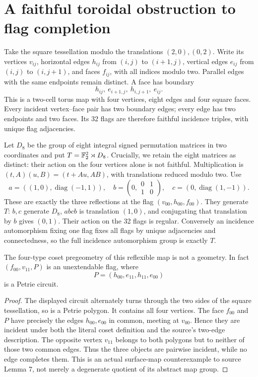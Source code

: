 \documentclass[11pt,a4paper]{article}
\begin{document}
\section{A faithful toroidal obstruction to flag completion}

Take the square tessellation modulo the translations $(2,0),(0,2)$.
Write its vertices $v_{ij}$, horizontal edges $h_{ij}$ from $(i,j)$
to $(i+1,j)$, vertical edges $e_{ij}$ from $(i,j)$ to $(i,j+1)$,
and faces $f_{ij}$, with all indices modulo two. Parallel edges with
the same endpoints remain distinct. A face has boundary
\[
 h_{ij},\ e_{i+1,j},\ h_{i,j+1},\ e_{ij}.
\]
This is a two-cell torus map with four vertices, eight edges and
four square faces. Every incident vertex--face pair has two boundary
edges; every edge has two endpoints and two faces. Its 32 flags are
therefore faithful incidence triples, with unique flag adjacencies.

Let $D_8$ be the group of eight integral signed permutation matrices
in two coordinates and put $T=\mathbb F_2^2\rtimes D_8$. Crucially, we
retain the eight matrices as distinct: their action on the four
vertices alone is not faithful. Multiplication is
$(t,A)(u,B)=(t+Au,AB)$, with translations reduced modulo two.
Use
\[
 a=( (1,0),\operatorname{diag}(-1,1)),\quad
 b=(0,\begin{smallmatrix}0&1\\1&0\end{smallmatrix}),\quad
 c=(0,\operatorname{diag}(1,-1)).
\]
These are exactly the three reflections at the flag
$(v_{00},h_{00},f_{00})$. They generate $T$: $b,c$ generate
$D_8$, $abcb$ is translation $(1,0)$, and conjugating that
translation by $b$ gives $(0,1)$. Their action on the 32 flags is
regular. Conversely an incidence automorphism fixing one flag fixes
all flags by unique adjacencies and connectedness, so the full
incidence automorphism group is exactly $T$.

\begin{proposition}\label{torus}
The four-type coset pregeometry of this reflexible map is not a
geometry. In fact $(f_{00},v_{11},P)$ is an unextendable flag, where
\[
                 P=(h_{00},e_{11},h_{11},e_{00})
\]
is a Petrie circuit.
\end{proposition}
\begin{proof}
The displayed circuit alternately turns through the two sides of the
square tessellation, so is a Petrie polygon. It contains all four
vertices. The face $f_{00}$ and $P$ have precisely the edges
$h_{00},e_{00}$ in common, meeting at $v_{00}$. Hence they are
incident under both the literal coset definition and the source's
two-edge description. The opposite vertex $v_{11}$ belongs to
both polygons but to neither of those two common edges. Thus the
three objects are pairwise incident, while no edge completes them.
This is an actual surface-map counterexample to source Lemma 7,
not merely a degenerate quotient of its abstract map group.
\end{proof}
\end{document}
